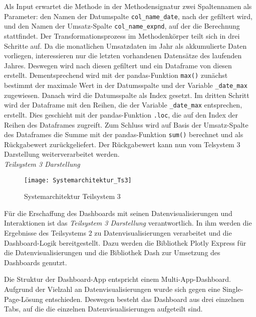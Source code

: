     Als Input erwartet die Methode in der Methodensignatur zwei Spaltennamen als Parameter: den Namen der Datumspalte \texttt{col\_name\_date}, nach der gefiltert wird,
    und den Namen der Umsatz-Spalte \texttt{col\_name\_expnd}, auf der die Berechnung stattfindet. Der Transformationsprozess im Methodenkörper teilt sich in drei Schritte auf. Da die monatlichen Umsatzdaten im Jahr als 
    akkumulierte Daten vorliegen, interessieren nur die letzten vorhandenen Datensätze des laufenden Jahres. Deswegen
    wird nach diesen gefiltert und ein Dataframe von diesen erstellt. Dementsprechend wird mit der pandas-Funktion \texttt{max()} 
    zunächst bestimmt der maximale Wert in der Datumsspalte und der Variable \texttt{\_date\_max} zugewiesen. Danach wird die Datumsspalte als Index gesetzt. 
    Im dritten Schritt wird der Dataframe mit den Reihen, die der Variable \texttt{\_date\_max} entsprechen, erstellt. Dies geschieht mit der pandas-Funktion \texttt{.loc}, die
    auf den Index der Reihen des Dataframes zugreift. Zum Schluss wird auf Basis der Umsatz-Spalte des Dataframes die Summe mit der pandas-Funktion \texttt{sum()} berechnet 
    und als Rückgabewert zurückgeliefert. Der Rückgabewert kann nun vom Telsystem 3 Darstellung weiterverarbeitet werden.\\

    \noindent
    \textit{Teilsystem 3 Darstellung}\\

    \begin{figure}[H]
        \centering
            \texttt{[image: Systemarchitektur\_Ts3]}
            \caption{Systemarchitektur Teilsystem 3}
            \label{fig:Systemarchitektur Teilsystem 3}
    \end{figure}

    Für die Erschaffung des Dashboards mit seinen Datenvisualisierungen und Interaktionen ist das \textit{Teilsystem 3 Darstellung} verantwortlich.
    In ihm werden die Ergebnisse des Teilsystems 2 zu Datenvisualisierungen verarbeitet und die Dashboard-Logik bereitgestellt.
    Dazu werden die Bibliothek Plotly Express für die Datenvisualisierungen und die Bibliothek Dash zur Umsetzung des Dashboards genutzt. 
    
    Die Struktur der Dashboard-App entspricht einem Multi-App-Dashboard.
    Aufgrund der Vielzahl an Datenvisualisierungen wurde sich gegen eine Single-Page-Lösung entschieden. Deswegen besteht das Dashboard
    aus drei einzelnen Tabs, auf die die einzelnen Datenvisualisierungen aufgeteilt sind.
    
